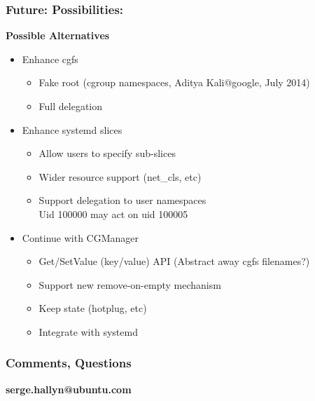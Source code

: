 \documentclass{beamer}
\begin{document}
\begin{frame}
\frametitle{Future: Possibilities:}
\textbf{Possible Alternatives}

\begin{itemize}
\item Enhance cgfs
	\begin{itemize}
	\item Fake root (cgroup namespaces, Aditya Kali@google, July 2014)
	\item Full delegation
	\end{itemize}

\item Enhance systemd slices
	\begin{itemize}
	\item Allow users to specify sub-slices
	\item Wider resource support (net\_cls, etc)
	\item Support delegation to user namespaces \\
	Uid 100000 may act on uid 100005
	\end{itemize}

\item Continue with CGManager
	\begin{itemize}
	\item Get/SetValue (key/value) API (Abstract away cgfs filenames?)
	\item Support new remove-on-empty mechanism
	\item Keep state (hotplug, etc)
	\item Integrate with systemd
	\end{itemize}
\end{itemize}
\end{frame}

\begin{frame}
\frametitle{Comments, Questions}
\textbf{ serge.hallyn@ubuntu.com }
\end{frame}
\end{document}
